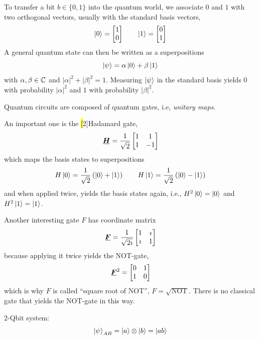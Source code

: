 To transfer a bit $b \in \{0, 1\}$ into the quantum world, we associate $0$ and $1$ with two orthogonal vectors, usually with the standard basis vectors,
\[
\ket{0} = \begin{bmatrix} 1 \\ 0 \end{bmatrix}
\qquad
\ket{1} = \begin{bmatrix} 0 \\ 1 \end{bmatrix}
\]
A general quantum state can then be written as a superpositions
\[
\ket{\psi} = \alpha \ket{0} + \beta \ket{1}
\]
with $\alpha, \beta \in \mathbb{C}$ and $|\alpha|^2 + |\beta|^2 = 1$.
Measuring $\ket{\psi}$ in the standard basis yields $0$ with probability $|\alpha|^2$ and $1$ with probability $|\beta|^2$.

Quantum circuits are composed of quantum gates, i.e, \emph{unitary maps}.

An important one is the \hl[2]{Hadamard gate},
\[
\matr{H} 
=
\frac{1}{\sqrt{2}}
\begin{bmatrix}
1 & 1 \\
1 & -1
\end{bmatrix}
\]
which maps the basis states to superpositions 
\[
H \ket{0} = \frac{1}{\sqrt{2}}\left(\ket{0} + \ket{1}\right)
\qquad
H \ket{1} = \frac{1}{\sqrt{2}}\left(\ket{0} - \ket{1}\right)
\]
and when applied twice, yields the basis states again, i.e.,
\(H^2 \ket{0} = \ket{0}\)
and
\(H^2 \ket{1} = \ket{1}\).
\pagebreak[2]

Another interesting gate \(F\) has coordinate matrix
\[
\matr{F} 
=
\frac{1}{\sqrt{2 \iu}}
\begin{bmatrix}
1 & \iu \\
\iu & 1
\end{bmatrix}
\]
because applying it twice yields the NOT-gate,
\[
\matr{F}^{2} 
=
\begin{bmatrix}
0 & 1 \\
1 & 0
\end{bmatrix}
\]
which is why \(F\) is called ``square root of NOT'', \(F = \sqrt{\text{NOT}}\).
There is no classical gate that yields the NOT-gate in this way.



2-Qbit system:
\[
\ket{\psi}_{AB}
=
\ket{a}\otimes\ket{b}
=
\ket{ab}
\]






















